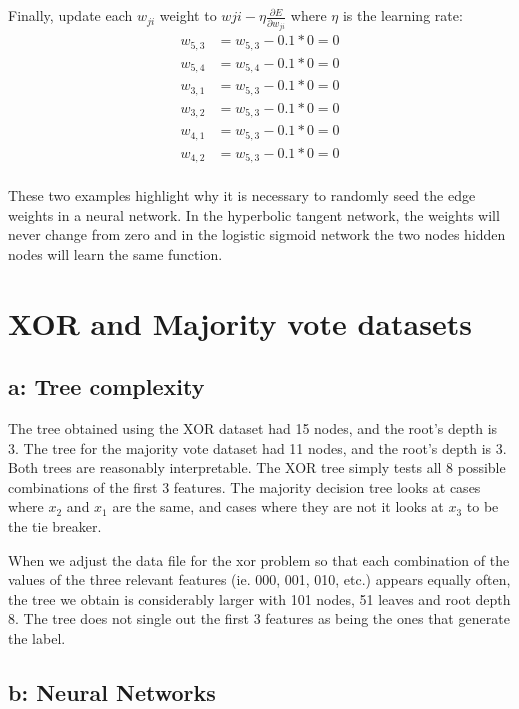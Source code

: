 \documentclass{article}
\begin{document}
\\
\\
Finally, update each $w_{ji}$ weight to $w{ji} - \eta \frac{\partial E}{\partial w_{ji}}$ where $\eta$ is the learning rate:
\begin{align*}
 w_{5,3} &= w_{5,3} - 0.1*0 = 0\\
 w_{5,4} &= w_{5,4} - 0.1*0 = 0\\
 w_{3,1} &= w_{5,3} - 0.1*0 = 0\\
 w_{3,2} &= w_{5,3} - 0.1*0 = 0\\
 w_{4,1} &= w_{5,3} - 0.1*0 = 0\\
 w_{4,2} &= w_{5,3} - 0.1*0 = 0\\
\end{align*}

These two examples highlight why it is necessary to randomly seed the edge weights in a neural network. In the hyperbolic tangent network, the weights will never change from zero and in the logistic sigmoid network the two nodes hidden nodes will learn the same function.

\section{XOR and Majority vote datasets}

\subsection*{a: Tree complexity}
The tree obtained using the XOR dataset had 15 nodes, and the root's depth is 3.
The tree for the majority vote dataset had 11 nodes, and the root's depth is 3.
Both trees are reasonably interpretable. The XOR tree simply tests all 8 possible combinations of the first 3 features.
The majority decision tree looks at cases where $x_2$ and $x_1$ are the same, and cases where they are not it looks at $x_3$ to be the tie breaker. 


When we adjust the data file for the xor problem so that each combination of the values of the three relevant features (ie. 000, 001, 010, etc.) appears equally often, the tree we obtain is considerably larger with 101 nodes, 51 leaves and root depth 8. The tree does not single out the first 3 features as being the ones that generate the label. 


\subsection*{b: Neural Networks}
\end{document}
